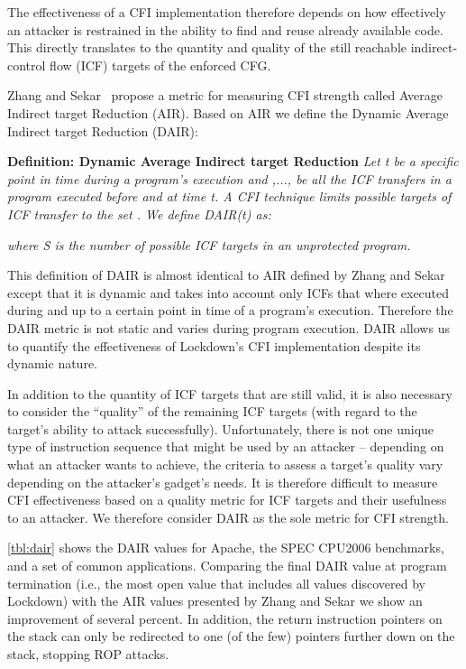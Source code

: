 \documentclass{acm_proc_article-sp}
\begin{document}
The effectiveness of a CFI implementation therefore depends on how effectively
an attacker is restrained in the ability to find and reuse already available
code. This directly translates to the quantity and quality of the still
reachable indirect-control flow (ICF) targets of the enforced CFG.

Zhang and Sekar~\cite{zhang13security} propose a metric for measuring CFI
strength called Average Indirect target Reduction (AIR). Based on AIR we define
the Dynamic Average Indirect target Reduction (DAIR):

{\bf Definition: Dynamic Average Indirect target Reduction}
{\it Let t be a specific point in time during a program's execution and
,..., be all the ICF transfers in a program executed before and at time t.
A CFI technique limits possible targets of ICF transfer  to the set
. We define DAIR(t) as:}

{\it where S is the number of possible ICF targets in an unprotected program.}

This definition of DAIR is almost identical to AIR defined by Zhang and Sekar
except that it is dynamic and takes into account only ICFs that where
executed during and up to a certain point in time  of a program's execution.
Therefore the DAIR metric is not static and  varies during program execution.
DAIR allows us to quantify the effectiveness of Lockdown's CFI implementation
despite its dynamic nature.

In addition to the quantity of ICF targets that are still valid, it is also
necessary to consider the ``quality'' of the remaining ICF targets
(with regard to the target's ability to attack successfully). Unfortunately,
there is not one unique type of instruction sequence that might be used by an attacker
-- depending on what an attacker wants to achieve, the criteria to assess a target's
quality vary depending on the attacker's gadget's needs.
It is therefore difficult to measure CFI effectiveness based on a quality metric for 
ICF targets and their usefulness to an attacker. We therefore consider DAIR
as the sole metric for CFI strength.

\autoref{tbl:dair} shows the DAIR values for Apache, the SPEC CPU2006 benchmarks,
and a set of common applications. Comparing
the final DAIR value at program termination (i.e., the most open value that
includes all values discovered by Lockdown) with the AIR values presented by
Zhang and Sekar we show an improvement of several percent. In addition, the
return instruction pointers on the stack can only be redirected to one (of the
few) pointers further down on the stack, stopping ROP attacks.
\end{document}
